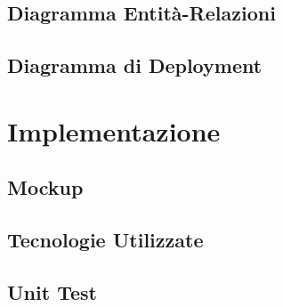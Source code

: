 \documentclass[12pt,a4paper]{report}
\begin{document}
\section{Diagramma Entit\`a-Relazioni}

\section{Diagramma di Deployment}

\chapter{Implementazione}
\label{ch:implementazione}

\section{Mockup}

\section{Tecnologie Utilizzate}

\section{Unit Test}
\end{document}
